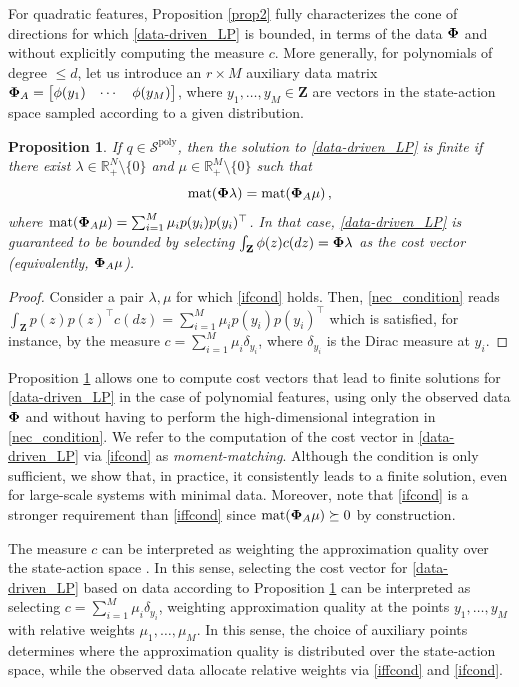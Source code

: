 \documentclass[journal,twoside,web]{ieeecolor}
\newtheorem{prop}{Proposition}
\newcommand{\Sc}{\mathcal{S}}
\newcommand{\Zb}{\mathbf{Z}}
\DeclareMathOperator{\mat}{mat}
\newcommand{\review}{\color{black}}
\begin{document}
For quadratic features, Proposition \ref{prop2} fully characterizes the cone of directions for which \eqref{data-driven_LP} is bounded, in terms of the data $\bold \Phi$ and without explicitly computing the measure $c$. More generally, for polynomials of degree $\le d$, let us introduce an $r\times M$ auxiliary data matrix $\bold\Phi_A=\begin{bmatrix}
    \phi(y_1) & \cdots & \phi(y_M)
\end{bmatrix}$, where $y_1,\ldots,y_M\in\Zb$ are vectors in the state-action space sampled according to a given distribution. 
%
\begin{prop} \label{proppoly}
    If $q\in\Sc^{\text{poly}}$, then the solution to \eqref{data-driven_LP} is finite if there exist $\lambda\in\mathbb{R}^{N}_+\setminus \{0\}$ and $\mu\in\mathbb{R}^{M}_+\setminus \{0\}$ such that
    \begin{equation} \label{ifcond}
        \mat (\bold \Phi \lambda) = \mat (\bold \Phi_A \mu)\,,
    \end{equation}
    where $\mat (\bold \Phi_A \mu)=\sum_{i=1}^{M} \mu_i p(y_i)p(y_i)^\top$.
    In that case, \eqref{data-driven_LP} is guaranteed to be bounded by selecting $\int_{\Zb} \phi (z) c(dz) = \bold \Phi \lambda$ as the cost vector (equivalently, $\bold \Phi_A \mu$).
\end{prop}
%
\begin{proof}
    Consider a pair $\lambda,\mu$ for which \eqref{ifcond} holds. Then, \eqref{nec_condition} reads $\int_{\Zb} p(z)p(z)^\top c(dz)=\sum_{i=1}^{M} \mu_i p(y_i)p(y_i)^\top$ which is satisfied, for instance, by the measure $c=\sum_{i=1}^M \mu_i \delta_{y_i}$, where $\delta_{y_i}$ is the Dirac measure at $y_i$.
\end{proof}
%
Proposition \ref{proppoly} allows one to compute cost vectors that lead to finite solutions for \eqref{data-driven_LP} in the case of polynomial features, using only the observed data $\bold \Phi$ and without {\review having to perform the high-dimensional integration in \eqref{nec_condition}.} We refer to the computation of the cost vector in \eqref{data-driven_LP} via \eqref{ifcond} as \textit{moment-matching}. Although the condition is only sufficient, we show that, in practice, it consistently leads to a finite solution, even for large-scale systems with minimal data. Moreover, note that \eqref{ifcond} is a stronger requirement than \eqref{iffcond} since $\mat (\bold \Phi_A \mu)\succeq0$ by construction. 

The measure $c$ can be interpreted as weighting the approximation quality over the state-action space \cite{PaulADP}. In this sense, selecting the cost vector for \eqref{data-driven_LP} based on data according to Proposition \ref{proppoly} can be interpreted as selecting $c=\sum_{i=1}^M \mu_i \delta_{y_i}$, weighting approximation quality at the points $y_1,\ldots,y_M$ with relative weights $\mu_1,\ldots,\mu_M$. {\review In this sense, the choice of auxiliary points determines where the approximation quality is distributed over the state-action space, while the observed data allocate relative weights via \eqref{iffcond} and \eqref{ifcond}.}
\end{document}
